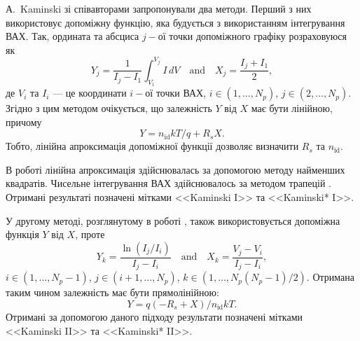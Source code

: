 А.~Kaminski зі співавторами \cite{Kaminski} запропонували два методи.
Перший з них використовує допоміжну функцію, яка будується з використанням інтегрування ВАХ.
Так, ордината та абсциса $j-$ої точки допоміжного графіку розраховуюся як
\begin{equation}
\label{eqKam1}
Y_j=\frac{1}{I_j-I_1}\int_{V_1}^{V_j}I\,dV \quad\text{and}\quad X_j=\frac{I_j+I_1}{2},
\end{equation}
де
$V_i$ та $I_i$ --- це координати $i-$ої точки ВАХ,
$i\in(1,\ldots, N_p)$,
$j\in(2,\ldots, N_p)$.
Згідно з цим методом очікується, що залежність $Y$ від $X$ має бути лінійною, причому
\begin{equation}
\label{eqKam1Det}
Y=n_\mathrm{id}kT/q+R_sX.
\end{equation}
Тобто, лінійна апроксимація допоміжної функції дозволяє визначити $R_s$ та $n_\mathrm{id}$.

В роботі лінійна апроксимація здійснювалась за допомогою методу найменших квадратів.
Чисельне інтегрування ВАХ здійснювалось за методом трапецій \cite[с.~98]{KalitkinBook}.
Отримані результаті позначені мітками <<Kaminski I>> та <<Kaminski* I>>.

У другому методі, розглянутому в роботі \cite{Kaminski}, також використовується допоміжна функція $Y$ від $X$, проте
\begin{equation}
\label{eqKam2}
Y_k=\frac{\ln(I_j/I_i)}{I_j-I_i} \quad\text{and}\quad X_k=\frac{V_j-V_i}{I_j-I_i},
\end{equation}
$i\in(1,\ldots, N_p-1)$,
$j\in(i+1,\ldots, N_p)$,
$k\in(1,\ldots, N_p(N_p-1)/2)$.
Отримана таким чином залежність має бути прямолінійною:
\begin{equation}
\label{eqKam2Det}
Y=q(-R_s+X)/n_\mathrm{id}kT.
\end{equation}
Отримані за допомогою даного підходу результати позначені мітками <<Kaminski II>> та <<Kaminski* II>>.

